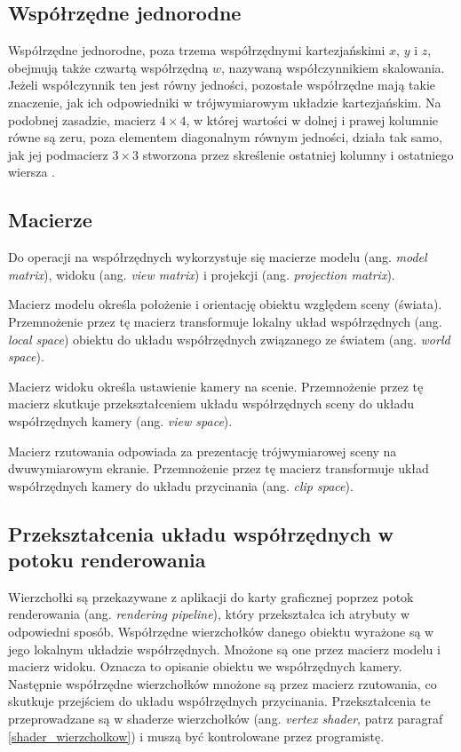 \documentclass[12pt, twoside, openany]{report}
\begin{document}
\subsection{Współrzędne jednorodne}
\label{wspolrzedne_jednorodne}

Współrzędne jednorodne, poza trzema współrzędnymi kartezjańskimi $x$, $y$ i $z$, obejmują także czwartą współrzędną $w$, nazywaną współczynnikiem skalowania. Jeżeli współczynnik ten jest równy jedności, pozostałe współrzędne mają takie znaczenie, jak ich odpowiedniki w trójwymiarowym układzie kartezjańskim. Na podobnej zasadzie, macierz $4\times 4$, w której wartości w dolnej i prawej kolumnie równe są zeru, poza elementem diagonalnym równym jedności, działa tak samo, jak jej podmacierz $3\times 3$ stworzona przez skreślenie ostatniej kolumny i ostatniego wiersza \cite{bib:matulewski}.

\subsection{Macierze}
\label{macierze}

Do operacji na współrzędnych wykorzystuje się macierze modelu (ang. \textit{model matrix}), widoku (ang. \textit{view matrix}) i projekcji (ang. \textit{projection matrix}).

Macierz modelu określa położenie i orientację obiektu względem sceny (świata). Przemnożenie przez tę macierz transformuje lokalny układ współrzędnych (ang. \textit{local space}) obiektu do układu współrzędnych związanego ze światem (ang. \textit{world space}).

Macierz widoku określa ustawienie kamery na scenie. Przemnożenie przez tę macierz skutkuje przekształceniem układu współrzędnych sceny do układu współrzędnych kamery (ang. \textit{view space}).

Macierz rzutowania odpowiada za prezentację trójwymiarowej sceny na dwuwymiarowym ekranie. Przemnożenie przez tę macierz transformuje układ współrzędnych kamery do układu przycinania (ang. \textit{clip space}).

\subsection{Przekształcenia układu współrzędnych w potoku renderowania}

Wierzchołki są przekazywane z aplikacji do karty graficznej poprzez potok renderowania (ang. \textit{rendering pipeline}), który przekształca ich atrybuty w odpowiedni sposób. Współrzędne wierzchołków danego obiektu wyrażone są w jego lokalnym układzie współrzędnych. Mnożone są one przez macierz modelu i macierz widoku. Oznacza to opisanie obiektu we współrzędnych kamery. Następnie współrzędne wierzchołków mnożone są przez macierz rzutowania, co skutkuje przejściem do układu współrzędnych przycinania. Przekształcenia te przeprowadzane są w shaderze wierzchołków (ang. \textit{vertex shader}, patrz paragraf \ref{shader_wierzcholkow}) i muszą być kontrolowane przez programistę.
\end{document}
